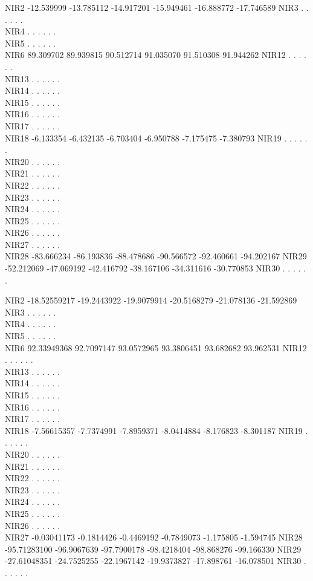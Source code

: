 \documentclass[
]{article}
\begin{document}
NIR2 -12.539999 -13.785112 -14.917201 -15.949461 -16.888772 -17.746589
NIR3 . . . . . .\\
NIR4 . . . . . .\\
NIR5 . . . . . .\\
NIR6 89.309702 89.939815 90.512714 91.035070 91.510308 91.944262 NIR12 .
. . . . .\\
NIR13 . . . . . .\\
NIR14 . . . . . .\\
NIR15 . . . . . .\\
NIR16 . . . . . .\\
NIR17 . . . . . .\\
NIR18 -6.133354 -6.432135 -6.703404 -6.950788 -7.175475 -7.380793 NIR19
. . . . . .\\
NIR20 . . . . . .\\
NIR21 . . . . . .\\
NIR22 . . . . . .\\
NIR23 . . . . . .\\
NIR24 . . . . . .\\
NIR25 . . . . . .\\
NIR26 . . . . . .\\
NIR27 . . . . . .\\
NIR28 -83.666234 -86.193836 -88.478686 -90.566572 -92.460661 -94.202167
NIR29 -52.212069 -47.069192 -42.416792 -38.167106 -34.311616 -30.770853
NIR30 . . . . . .

NIR2 -18.52559217 -19.2443922 -19.9079914 -20.5168279 -21.078136
-21.592869 NIR3 . . . . . .\\
NIR4 . . . . . .\\
NIR5 . . . . . .\\
NIR6 92.33949368 92.7097147 93.0572965 93.3806451 93.682682 93.962531
NIR12 . . . . . .\\
NIR13 . . . . . .\\
NIR14 . . . . . .\\
NIR15 . . . . . .\\
NIR16 . . . . . .\\
NIR17 . . . . . .\\
NIR18 -7.56615357 -7.7374991 -7.8959371 -8.0414884 -8.176823 -8.301187
NIR19 . . . . . .\\
NIR20 . . . . . .\\
NIR21 . . . . . .\\
NIR22 . . . . . .\\
NIR23 . . . . . .\\
NIR24 . . . . . .\\
NIR25 . . . . . .\\
NIR26 . . . . . .\\
NIR27 -0.03041173 -0.1814426 -0.4469192 -0.7849073 -1.175805 -1.594745
NIR28 -95.71283100 -96.9067639 -97.7900178 -98.4218404 -98.868276
-99.166330 NIR29 -27.61048351 -24.7525255 -22.1967142 -19.9373827
-17.898761 -16.078501 NIR30 . . . . . .
\end{document}
